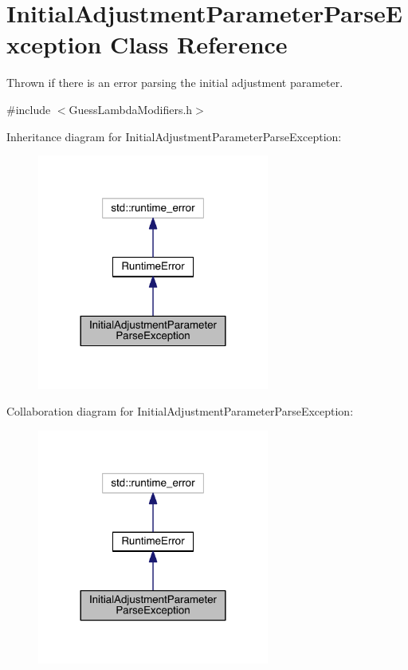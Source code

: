 \hypertarget{class_initial_adjustment_parameter_parse_exception}{}\section{Initial\+Adjustment\+Parameter\+Parse\+Exception Class Reference}
\label{class_initial_adjustment_parameter_parse_exception}


Thrown if there is an error parsing the initial adjustment parameter.  




{\ttfamily \#include $<$Guess\+Lambda\+Modifiers.\+h$>$}



Inheritance diagram for Initial\+Adjustment\+Parameter\+Parse\+Exception\+:
\nopagebreak
\begin{figure}[H]
\begin{center}
\leavevmode
\includegraphics[width=216pt]{df/d6d/class_initial_adjustment_parameter_parse_exception__inherit__graph}
\end{center}
\end{figure}


Collaboration diagram for Initial\+Adjustment\+Parameter\+Parse\+Exception\+:
\nopagebreak
\begin{figure}[H]
\begin{center}
\leavevmode
\includegraphics[width=216pt]{da/d9e/class_initial_adjustment_parameter_parse_exception__coll__graph}
\end{center}
\end{figure}
